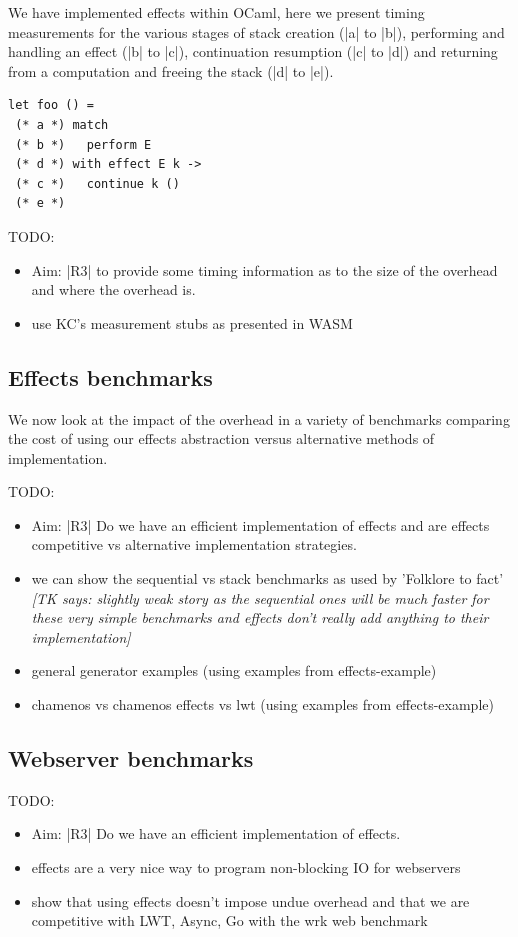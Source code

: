 \documentclass[sigplan,10pt,review,anonymous]{acmart}\settopmatter{printfolios=true,printccs=false,printacmref=false}
\newcommand{\tk}[1]{{\color{blue} {\it [TK says: #1]}}}
\begin{document}
We have implemented effects within OCaml, here we present timing measurements
for the various stages of stack creation (|a| to |b|), performing and handling
an effect (|b| to |c|), continuation resumption (|c| to |d|) and returning from
a computation and freeing the stack (|d| to |e|).

\begin{lstlisting}
let foo () =
 (* a *) match
 (* b *)   perform E
 (* d *) with effect E k ->
 (* c *)   continue k ()
 (* e *)
\end{lstlisting}

TODO:
\begin{itemize}
\item Aim: |R3| to provide some timing information as to the size of the overhead and where the overhead is.
\item use KC's measurement stubs as presented in WASM
\end{itemize}

\subsection{Effects benchmarks}

We now look at the impact of the overhead in a variety of benchmarks comparing
the cost of using our effects abstraction versus alternative methods of
implementation.

TODO:
\begin{itemize}
\item Aim: |R3| Do we have an efficient implementation of effects and are effects competitive vs alternative implementation strategies.
\item we can show the sequential vs stack benchmarks as used by 'Folklore to fact' \tk{slightly weak story as the sequential ones will be much faster for these very simple benchmarks and effects don't really add anything to their implementation}
\item general generator examples (using examples from effects-example)
\item chamenos vs chamenos effects vs lwt (using examples from effects-example)
\end{itemize}

\subsection{Webserver benchmarks}

TODO:
\begin{itemize}
\item Aim: |R3| Do we have an efficient implementation of effects.
\item effects are a very nice way to program non-blocking IO for webservers
\item show that using effects doesn't impose undue overhead and that we are competitive with LWT, Async, Go with the wrk web benchmark
\end{itemize}
\end{document}
